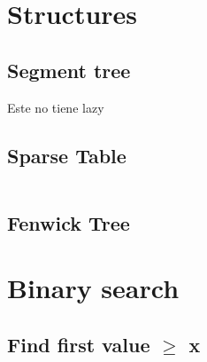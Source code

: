 \documentclass[twoside]{article}
\begin{document}
\begin{multicols*}{2}
	\section{}
	    
	\section{Structures}
	    \subsection{Segment tree}
	        Este no tiene lazy
    	\subsection{Sparse Table}
	    	\inputminted{cpp}{Estructuras/sparseTable.cpp}
    	\subsection{Fenwick Tree}
    
	\section{Binary search}
	    \subsection{Find first value $\geq$ x}
	        {}
\end{multicols*}
\end{document}
